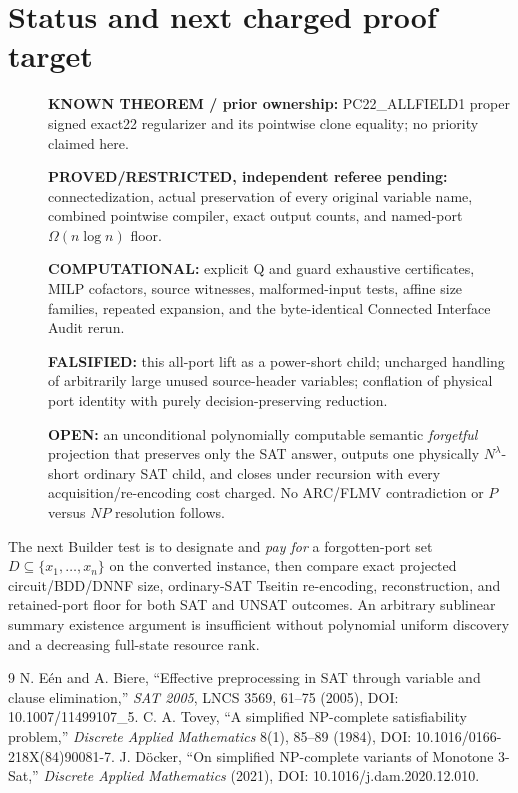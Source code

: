 \documentclass[11pt]{article}
\begin{document}
\section{Status and next charged proof target}
\begin{description}
\item[]\textbf{KNOWN THEOREM / prior ownership:} PC22\_ALLFIELD1 proper signed exact22 regularizer and its pointwise clone equality; no priority claimed here.
\item[]\textbf{PROVED/RESTRICTED, independent referee pending:} connectedization, actual preservation of every original variable name, combined pointwise compiler, exact output counts, and named-port $\Omega(n\log n)$ floor.
\item[]\textbf{COMPUTATIONAL:} explicit Q and guard exhaustive certificates, MILP cofactors, source witnesses, malformed-input tests, affine size families, repeated expansion, and the byte-identical Connected Interface Audit rerun.
\item[]\textbf{FALSIFIED:} this all-port lift as a power-short child; uncharged handling of arbitrarily large unused source-header variables; conflation of physical port identity with purely decision-preserving reduction.
\item[]\textbf{OPEN:} an unconditional polynomially computable semantic \emph{forgetful} projection that preserves only the SAT answer, outputs one physically $N^\lambda$-short ordinary SAT child, and closes under recursion with every acquisition/re-encoding cost charged. No ARC/FLMV contradiction or $P$ versus $NP$ resolution follows.
\end{description}
The next Builder test is to designate and \emph{pay for} a forgotten-port set $D\subseteq\{x_1,\ldots,x_n\}$ on the converted instance, then compare exact projected circuit/BDD/DNNF size, ordinary-SAT Tseitin re-encoding, reconstruction, and retained-port floor for both SAT and UNSAT outcomes. An arbitrary sublinear summary existence argument is insufficient without polynomial uniform discovery and a decreasing full-state resource rank.

\begin{thebibliography}{9}
 N. E\'en and A. Biere, ``Effective preprocessing in SAT through variable and clause elimination,'' \emph{SAT 2005}, LNCS 3569, 61--75 (2005), DOI: 10.1007/11499107\_5.
 C. A. Tovey, ``A simplified NP-complete satisfiability problem,'' \emph{Discrete Applied Mathematics} 8(1), 85--89 (1984), DOI: 10.1016/0166-218X(84)90081-7.
 J. D\"ocker, ``On simplified NP-complete variants of Monotone 3-Sat,'' \emph{Discrete Applied Mathematics} (2021), DOI: 10.1016/j.dam.2020.12.010.
\end{thebibliography}
\end{document}
